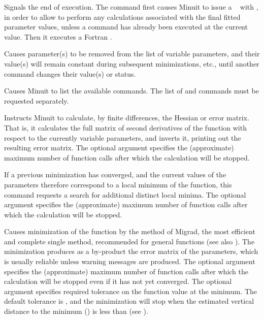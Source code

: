 
Signals the end of execution.
The  command first causes Minuit to issue a
~ with ,
in order to allow  to perform any calculations associated with
the final fitted parameter values,
unless a  command has already been executed
at the current  value.
Then it executes a Fortran .


Causes parameter(s)  to be removed from the list of variable
parameters, and their value(s) will remain constant
during subsequent minimizations, etc., until another command changes
their value(s) or status.


Causes Minuit to list the available commands. The list of
 and  commands must be requested separately.


Instructs Minuit to calculate, by finite differences, the Hessian or
error matrix. That is, it calculates the full matrix of second
derivatives of the function with respect to the currently variable
parameters, and inverts it, printing out the resulting error matrix.
The optional argument \Lit{[maxcalls]} specifies the (approximate) maximum
number of function calls after which the calculation will be stopped.


If a previous minimization has converged, and the current values
of the parameters therefore correspond to a local minimum of the function,
this command requests a search for additional distinct local minima.
The optional argument \Lit{[maxcalls]} specifies the (approximate) maximum
number of function calls after which the calculation will be stopped.


Causes minimization of the function by the method of Migrad, the most
efficient and complete single method, recommended for general functions
(see also ).
The minimization produces as a by-product the error matrix
of the parameters, which is usually reliable unless warning messages
are produced.
The optional argument \Lit{[maxcalls]} specifies the (approximate) maximum
number of function calls after which the calculation will be stopped
even if it has not yet converged.
The optional argument \Lit{[tolerance]} specifies required tolerance on the
function value at the minimum.  The default tolerance is , and the
minimization will stop when the estimated vertical distance to
the minimum () is less than  
(see ).

